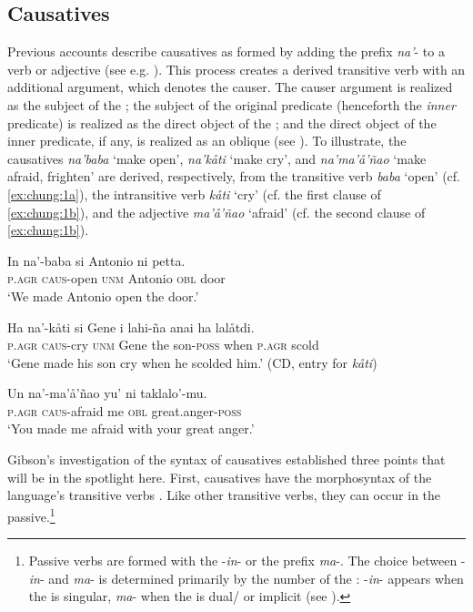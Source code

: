 \documentclass[output=paper,
modfonts
]{LSP/langsci}
\begin{document}
\begin{exe}
\begin{xlist}
\section{Causatives}\label{sec:chung:3}

Previous accounts describe  causatives as formed by adding the
prefix \emph{na'}- to a verb or adjective (see e.g. \citealt{baker1985,gibson1980,safford1904,topping1973}). This process creates a
derived transitive verb with an additional argument, which denotes the
causer. The causer argument is realized as the subject of the ;
the subject of the original predicate (henceforth the \emph{inner}
predicate) is realized as the direct object of the ; and the
direct object of the inner predicate, if any, is realized as an oblique
(see \citealt{gibson1980}). To illustrate, the causatives \emph{na'baba} `make
open', \emph{na'kåti} `make cry', and \emph{na'ma'å'ñao} `make afraid,
frighten' are derived, respectively, from the transitive verb
\emph{baba} `open' (cf. \ref{ex:chung:1a}), the intransitive verb \emph{kåti} `cry'
(cf. the first clause of \ref{ex:chung:1b}), and the adjective \emph{ma'å'ñao}
`afraid' (cf. the second clause of \ref{ex:chung:1b}).

\ea \label{ex:chung:7}
\ea \label{ex:chung:7a}
\gll In na'-baba si Antonio ni petta.\\
\textsc{p.agr} \textsc{caus-}open \textsc{unm} Antonio \textsc{obl} door\\
\glt `We made Antonio open the door.'

\ex \label{ex:chung:7b} \gll Ha na'-kåti si Gene i lahi-ña anai ha lalåtdi.\\
\textsc{p.agr} \textsc{caus-}cry \textsc{unm} Gene the son-\textsc{poss} when \textsc{p.agr } scold\\
\glt `Gene made his son cry when he scolded him.' (CD, entry for \emph{kåti})

\ex \label{ex:chung:7c} \gll Un na'-ma'å'ñao yu' ni taklalo'-mu.\\
\textsc{p.agr} \textsc{caus-}afraid me \textsc{obl} great.anger-\textsc{poss}\\
\glt `You made me afraid with your great anger.'
\z
\z

Gibson's \citeyear{gibson1980} investigation of the syntax of  causatives
established three points that will be in the spotlight here. First,
causatives have the morphosyntax of the language's transitive verbs
\citep[86--91]{gibson1980}. Like other transitive verbs, they can occur in the
passive.\footnote{Passive verbs are formed with the  -\emph{in}- or
  the prefix \emph{ma}-. The choice between -\emph{in}- and \emph{ma}-
  is determined primarily by the number of the  :
  -\emph{in}- appears when the  is singular, \emph{ma}- when the
   is dual/ or implicit (see \citealt[38, note 8]{chung1998}).}


\end{xlist}
\end{exe}
\end{document}

